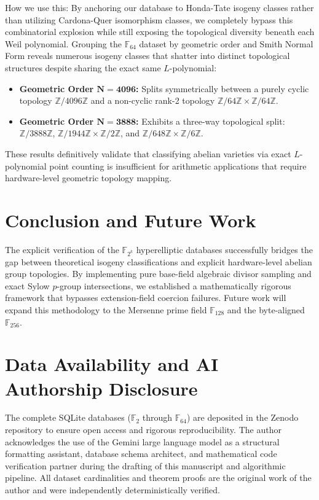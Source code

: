 \documentclass[letterpaper, 11pt]{article}
\begin{document}
How we use this: By anchoring our database to Honda-Tate isogeny classes rather than utilizing Cardona-Quer isomorphism classes, we completely bypass this combinatorial explosion while still exposing the topological diversity beneath each Weil polynomial. Grouping the $\mathbb{F}_{64}$ dataset by geometric order and Smith Normal Form reveals numerous isogeny classes that shatter into distinct topological structures despite sharing the exact same $L$-polynomial:
\begin{itemize}
    \item \textbf{Geometric Order $\mathbf{N=4096}$:} Splits symmetrically between a purely cyclic topology $\mathbb{Z}/4096\mathbb{Z}$ and a non-cyclic rank-2 topology $\mathbb{Z}/64\mathbb{Z} \times \mathbb{Z}/64\mathbb{Z}$.
    \item \textbf{Geometric Order $\mathbf{N=3888}$:} Exhibits a three-way topological split: $\mathbb{Z}/3888\mathbb{Z}$, $\mathbb{Z}/1944\mathbb{Z} \times \mathbb{Z}/2\mathbb{Z}$, and $\mathbb{Z}/648\mathbb{Z} \times \mathbb{Z}/6\mathbb{Z}$.
\end{itemize}
These results definitively validate that classifying abelian varieties via exact $L$-polynomial point counting is insufficient for arithmetic applications that require hardware-level geometric topology mapping. 

\section{Conclusion and Future Work}
The explicit verification of the $\mathbb{F}_{2^k}$ hyperelliptic databases successfully bridges the gap between theoretical isogeny classifications and explicit hardware-level abelian group topologies. By implementing pure base-field algebraic divisor sampling and exact Sylow $p$-group intersections, we established a mathematically rigorous framework that bypasses extension-field coercion failures. Future work will expand this methodology to the Mersenne prime field $\mathbb{F}_{128}$ and the byte-aligned $\mathbb{F}_{256}$.

\section{Data Availability and AI Authorship Disclosure}
The complete SQLite databases ($\mathbb{F}_{2}$ through $\mathbb{F}_{64}$) are deposited in the Zenodo repository to ensure open access and rigorous reproducibility. The author acknowledges the use of the Gemini large language model \cite{Gemini2026} as a structural formatting assistant, database schema architect, and mathematical code verification partner during the drafting of this manuscript and algorithmic pipeline. All dataset cardinalities and theorem proofs are the original work of the author and were independently deterministically verified.
\end{document}
